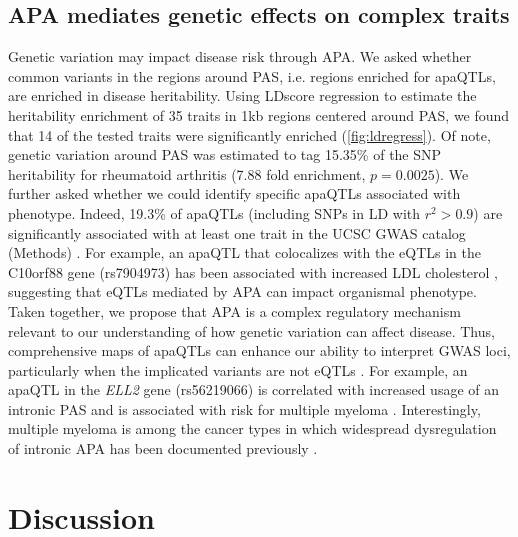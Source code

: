 \subsection{APA mediates genetic effects on complex traits}\label{APA-traits}

Genetic variation may impact disease risk through APA. We asked whether common variants in the regions around PAS, i.e. regions enriched for apaQTLs, are enriched in disease heritability. Using LDscore regression to estimate the heritability enrichment of 35 traits in 1kb regions centered around PAS, we found that 14 of the tested traits were significantly enriched (\ref{fig:ldregress}). Of note, genetic variation around PAS was estimated to tag 15.35\% of the SNP heritability for rheumatoid arthritis (7.88 fold enrichment, $p = 0.0025$). We further asked whether we could identify specific apaQTLs associated with phenotype. Indeed, 19.3\% of apaQTLs (including SNPs in LD with $r^{2} > 0.9$) are significantly associated with at least one trait in the UCSC GWAS catalog (Methods) \citep{kent_human_2002}. For example, an apaQTL that colocalizes with the eQTLs in the C10orf88 gene (rs7904973) has been associated with increased LDL cholesterol \citep{klarin_genetics_2018}, suggesting that eQTLs mediated by APA can impact organismal phenotype. Taken together, we propose that APA is a complex regulatory mechanism relevant to our understanding of how genetic variation can affect disease. Thus, comprehensive maps of apaQTLs can enhance our ability to interpret GWAS loci, particularly when the implicated variants are not eQTLs \citep{joehanes_integrated_2017, lee_widespread_2018}. For example, an apaQTL in the {\it ELL2} gene (rs56219066) is correlated with increased usage of an intronic PAS and is associated with risk for multiple myeloma \citep{swaminathan_variants_2015}. Interestingly, multiple myeloma is among the cancer types in which widespread dysregulation of intronic APA has been documented previously \citep{singh_widespread_2018, lee_widespread_2018}.



\section{Discussion}\label{ch02-discussion}

